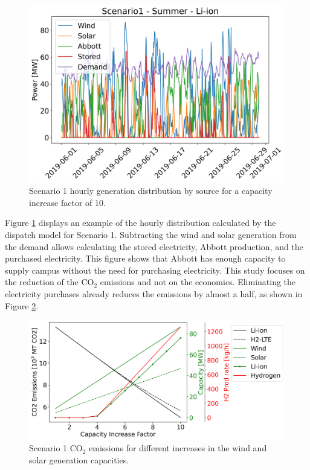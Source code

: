 \documentclass{anstrans}
\begin{document}
\begin{figure}[htbp!] %
    \centering
    \includegraphics[width=0.90\linewidth]{figures/scenario1-summerB}
    \hfill
    \caption{Scenario 1 hourly generation distribution by source for a capacity increase factor of 10.}
    \label{fig:1-summer-distrib}
\end{figure}

Figure \ref{fig:1-summer-distrib} displays an example of the hourly distribution calculated by the dispatch model for Scenario 1.
Subtracting the wind and solar generation from the demand allows calculating the stored electricity, Abbott production, and the purchased electricity.
This figure shows that Abbott has enough capacity to supply campus without the need for purchasing electricity.
This study focuses on the reduction of the CO$_2$ emissions and not on the economics.
Eliminating the electricity purchases already reduces the emissions by almost a half, as shown in Figure \ref{fig:1-summer-emissions}.

\begin{figure}[htbp!] %
    \centering
    \includegraphics[width=0.99\linewidth]{figures/scenario1-summerA}
    \hfill
    \caption{Scenario 1 CO$_2$ emissions for different increases in the wind and solar generation capacities.}
    \label{fig:1-summer-emissions}
\end{figure}
\end{document}
